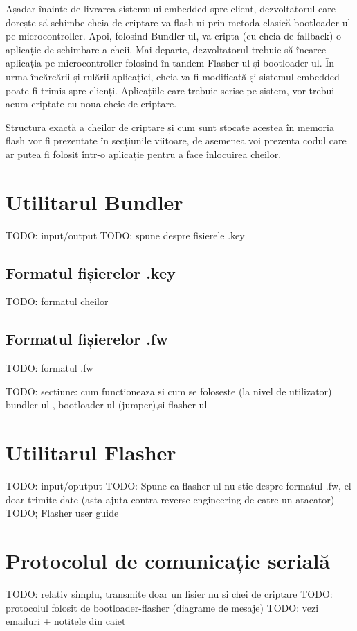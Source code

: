 \documentclass[12pt,a4paper,titlepage]{report}
\begin{document}
Așadar înainte de livrarea sistemului embedded spre client, dezvoltatorul care dorește să schimbe cheia de criptare va flash-ui prin metoda clasică bootloader-ul pe microcontroller. Apoi, folosind Bundler-ul, va cripta (cu cheia de fallback) o aplicație de schimbare a cheii. Mai departe, dezvoltatorul trebuie să încarce aplicația pe microcontroller folosind în tandem Flasher-ul și bootloader-ul. În urma încărcării și rulării aplicației, cheia va fi modificată și sistemul embedded poate fi trimis spre clienți. Aplicațiile care trebuie scrise pe sistem, vor trebui acum criptate cu noua cheie de criptare.

Structura exactă a cheilor de criptare și cum sunt stocate acestea în memoria flash vor fi prezentate în secțiunile viitoare, de asemenea voi prezenta codul care ar putea fi folosit într-o aplicație pentru a face înlocuirea cheilor.

\section{Utilitarul Bundler}
TODO: input/output
TODO: spune despre fisierele .key

\subsection{Formatul fișierelor .key}
TODO: formatul cheilor

\subsection{Formatul fișierelor .fw}
TODO: formatul .fw

TODO: sectiune: cum functioneaza si cum se foloseste (la nivel de utilizator)  bundler-ul , bootloader-ul (jumper),si flasher-ul

\section{Utilitarul Flasher}
TODO: input/oputput
TODO: Spune ca flasher-ul nu stie despre formatul .fw, el doar trimite date (asta ajuta contra reverse engineering de catre un atacator)
TODO; Flasher user guide

\section{Protocolul de comunicație serială}
TODO: relativ simplu, transmite doar un fisier nu si chei de criptare
TODO: protocolul folosit de bootloader-flasher (diagrame de mesaje)
TODO: vezi emailuri + notitele din caiet
\end{document}
